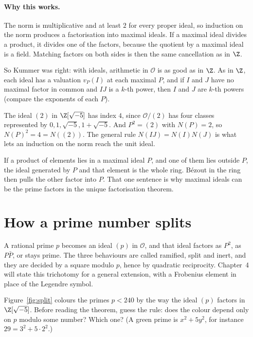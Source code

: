 \paragraph{Why this works.}
The norm is multiplicative and at least $2$ for every proper ideal, so induction on the norm produces a factorisation into maximal ideals. If a maximal ideal divides a product, it divides one of the factors, because the quotient by a maximal ideal is a field. Matching factors on both sides is then the same cancellation as in $\Z$.

So Kummer was right: with ideals, arithmetic in $\mathcal O$ is as good as in $\Z$. As in $\Z$, each ideal has a valuation $v_P(I)$ at each maximal $P$, and if $I$ and $J$ have no maximal factor in common and $IJ$ is a $k$-th power, then $I$ and $J$ are $k$-th powers (compare the exponents of each $P$).

\begin{examplex}
The ideal $(2)$ in $\Z[\sqrt{-5}]$ has index $4$, since $\mathcal O/(2)$ has four classes represented by $0,1,\sqrt{-5},1+\sqrt{-5}$. And $P^2=(2)$ with $N(P)=2$, so $N(P)^2=4=N((2))$. The general rule $N(IJ)=N(I)N(J)$ is what lets an induction on the norm reach the unit ideal.
\end{examplex}

\begin{examplex}
If a product of elements lies in a maximal ideal $P$, and one of them lies outside $P$, the ideal generated by $P$ and that element is the whole ring. Bézout in the ring then pulls the other factor into $P$. That one sentence is why maximal ideals can be the prime factors in the unique factorisation theorem.
\end{examplex}

\section{How a prime number splits}

A rational prime $p$ becomes an ideal $(p)$ in $\mathcal O$, and that ideal factors as $P^2$, as $P\bar P$, or stays prime. The three behaviours are called ramified, split and inert, and they are decided by a square modulo $p$, hence by quadratic reciprocity. Chapter~4 will state this trichotomy for a general extension, with a Frobenius element in place of the Legendre symbol.

\begin{think}
Figure~\ref{fig:split} colours the primes $p<240$ by the way the ideal $(p)$ factors in $\Z[\sqrt{-5}]$. Before reading the theorem, guess the rule: does the colour depend only on $p$ modulo some number? Which one? (A green prime is $x^2+5y^2$, for instance $29=3^2+5\cdot2^2$.)
\end{think}

